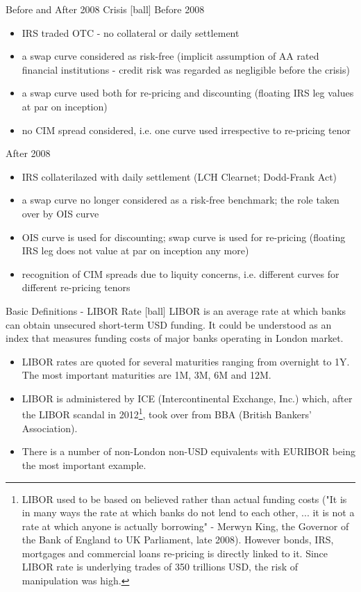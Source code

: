 \documentclass{beamer}
\begin{document}
\begin{frame}{Before and After 2008 Crisis}
[ball]
Before 2008
\begin{itemize}
\item IRS traded OTC - no collateral or daily settlement
\item a swap curve considered as risk-free (implicit assumption of AA rated financial institutions - credit risk was regarded as negligible before the crisis)
\item a swap curve used both for re-pricing and discounting (floating IRS leg values at par on inception)
\item no CIM spread considered, i.e. one curve used irrespective to re-pricing tenor
\end{itemize}
After 2008
\begin{itemize}
\item IRS collaterilazed with daily settlement (LCH Clearnet; Dodd-Frank Act)
\item a swap curve no longer considered as a risk-free benchmark; the role taken over by OIS curve
\item OIS curve is used for discounting; swap curve is used for re-pricing (floating IRS leg does not value at par on inception any more)
\item recognition of CIM spreads due to liquity concerns, i.e. different curves for different re-pricing tenors
\end{itemize}
\end{frame}

\begin{frame}{Basic Definitions - LIBOR Rate}
[ball]
LIBOR is an average rate at which banks can obtain unsecured short-term USD funding. It could be understood as an index that measures funding costs of major banks operating in London market.
\begin{itemize}
\item LIBOR rates are quoted for several maturities ranging from overnight to 1Y. The most important maturities are 1M, 3M, 6M and 12M.
\item LIBOR is administered by ICE (Intercontinental Exchange, Inc.) which, after the LIBOR scandal in 2012\footnote{\tiny{LIBOR used to be based on believed rather than actual funding costs ("It is in many ways the rate at which banks do not lend to each other, ... it is not a rate at which anyone is actually borrowing" - Merwyn King, the Governor of the Bank of England to UK Parliament, late 2008). However bonds, IRS, mortgages and commercial loans re-pricing is directly linked to it. Since LIBOR rate is underlying trades of 350 trillions USD, the risk of manipulation was high.}}, took over from BBA (British Bankers' Association).
\item There is a number of non-London non-USD equivalents with EURIBOR being the most important example.
\end{itemize}
\end{frame}
\end{document}
